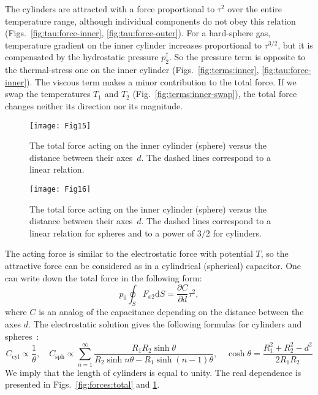 \documentclass[smallextended, final]{svjour3} %
\newcommand{\dd}{\mathrm{d}}
\newcommand{\pder}[2][]{\frac{\partial#1}{\partial#2}}
\begin{document}
The cylinders are attracted with a force proportional to \(\tau^2\) over the entire temperature range,
although individual components do not obey this relation (Figs.~\ref{fig:tau:force-inner}, \ref{fig:tau:force-outer}).
For a hard-sphere gas, temperature gradient on the inner cylinder increases proportional to \(\tau^{3/2}\),
but it is compensated by the hydrostatic pressure \(p^\dag_2\).
So the pressure term is opposite to the thermal-stress one on the inner cylinder
(Figs.~\ref{fig:terms:inner}, \ref{fig:tau:force-inner}).
The viscous term makes a minor contribution to the total force.
If we swap the temperatures \(T_1\) and \(T_2\) (Fig.~\ref{fig:terms:inner-swap}),
the total force changes neither its direction nor its magnitude.

\begin{figure}[ht]
    \centering
    \begin{minipage}{.48\textwidth}
        \centering
        \texttt{[image: Fig15]}
        \caption{The total force acting on the inner cylinder (sphere)
                versus the distance between their axes~\(d\).
                The dashed lines correspond to a linear relation.}
        \label{fig:forces:total}
    \end{minipage}
    \quad
    \begin{minipage}{.48\textwidth}
        \centering
        \texttt{[image: Fig16]}
        \caption{The total force acting on the inner cylinder (sphere)
                versus the distance between their axes~\(d\).
                The dashed lines correspond to a linear relation for spheres
                and to a power of \(3/2\) for cylinders.}
        \label{fig:forces:inverse}
    \end{minipage}
\end{figure}

The acting force is similar to the electrostatic force with potential \(T\),
so the attractive force can be considered as in a cylindrical (spherical) capacitor.
One can write down the total force in the following form:
\begin{equation}
    p_0\oint_S F_{x2}\dd{S} = \pder[C]{d} \tau^2,
\end{equation}
where \(C\) is an analog of the capacitance depending on the distance between the axes \(d\).
The electrostatic solution gives the following formulas for cylinders and spheres~\cite{Smythe1968Electricity}:
\begin{equation}
    C_\mathrm{cyl} \propto \frac1{\theta}, \quad
    C_\mathrm{sph} \propto  \sum_{n=1}^\infty \frac{R_1 R_2 \sinh\theta} {R_2\sinh n\theta - R_1\sinh (n-1)\theta}, \quad
    \cosh\theta = \frac{R_1^2 + R_2^2 - d^2}{2 R_1 R_2}
\end{equation}
We imply that the length of cylinders is equal to unity.
The real dependence is presented in Figs.~\ref{fig:forces:total} and \ref{fig:forces:inverse}.
\end{document}
